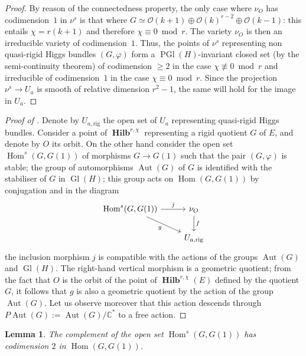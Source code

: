 \documentclass[12pt,english]{smfart}%
\theoremstyle{plain}
\newtheorem{lemma}[theorem]{Lemma}
\theoremstyle{definition}
\theoremstyle{remark}
\newcommand{\CC}{\mathbb{C}}
\newcommand{\Oh}{\mathcal{O}}
\DeclareMathOperator{\Hom}{Hom}
\DeclareMathOperator{\Aut}{Aut}
\DeclareMathOperator{\Gl}{Gl}
\DeclareMathOperator{\PGl}{PGl}
\DeclareMathOperator{\Hilb}{\mathbf{Hilb}}
\begin{document}
\begin{proof}
By reason of the connectedness property, the only case where $\nu_{O}$ has codimension~$1$ in $\nu^{s}$ is that where $G\simeq\Oh(k+1)\oplus\Oh(k)^{r-2}\oplus\Oh(k-1)$: this entails $\chi=r(k+1)$ and therefore $\chi\equiv 0\bmod r$. The variety $\nu_{O}$ is then an irreducible variety of codimension~$1$. Thus, the points of $\nu^{s}$ representing non quasi-rigid Higgs bundles $(G,\varphi)$ form a $\PGl(H)$-invariant closed set (by the semi-continuity theorem) of codimension $\geq 2$ in the case $\chi\not\equiv 0\bmod r$ and irreducible of codimension~$1$ in the case $\chi\equiv 0\bmod r$. Since the projection $\nu^{s}\to U_{a}$ is smooth of relative dimension $r^{2}-1$, the same will hold for the image in $U_{a}$.
\end{proof}

\begin{proof}[Proof of ]
Denote by $U_{a,\mathrm{rig}}$ the open set of $U_{a}$ representing quasi-rigid Higgs bundles. Consider a point of $\Hilb^{r,\chi}$ representing a rigid quotient $G$ of $E$, and denote by $O$ its orbit. On the other hand consider the open set $\Hom^{s}(G,G(1))$ of morphisms $G\to G(1)$ such that the pair $(G,\varphi)$ is stable; the group of automorphisms $\Aut(G)$ of $G$ is identified with the stabiliser of $G$ in $\Gl(H)$; this group acts on $\Hom(G,G(1))$ by conjugation and in the diagram
\[
\begin{tikzcd}
\Hom^{s}(G,G(1)) \arrow[r,"j"] \arrow[dr,"g"'] & \nu_{O} \arrow[d,"f"] \\
& U_{a,\mathrm{rig}}
\end{tikzcd}
\]
the inclusion morphism $j$ is compatible with the actions of the groups $\Aut(G)$ and $\Gl(H)$. The right-hand vertical morphism is a geometric quotient; from the fact that $O$ is the orbit of the point of $\Hilb^{r,\chi}(E)$ defined by the quotient $G$, it follows that $g$ is also a geometric quotient by the action of the group $\Aut(G)$. Let us observe moreover that this action descends through $P\Aut(G):=\Aut(G)/\CC^{*}$ to a free action.
\end{proof}

\begin{lemma}\label{lem:homs-codim}
The complement of the open set $\Hom^{s}(G,G(1))$ has codimension $2$ in $\Hom(G,G(1))$.
\end{lemma}
\end{document}
